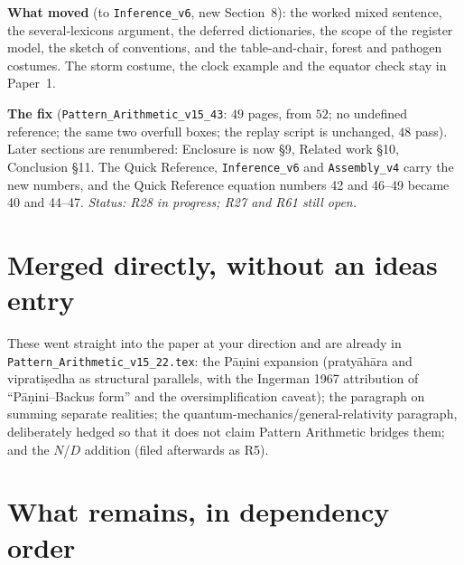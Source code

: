 \documentclass[11pt]{article}
\begin{document}
\textbf{What moved} (to \texttt{Inference\_v6}, new Section~8): the worked mixed sentence, the several-lexicons argument, the deferred dictionaries, the scope of the register model, the sketch of conventions, and the table-and-chair, forest and pathogen costumes. The storm costume, the clock example and the equator check stay in Paper~1.

\textbf{The fix} (\texttt{Pattern\_Arithmetic\_v15\_43}: $49$ pages, from $52$; no undefined reference; the same two overfull boxes; the replay script is unchanged, $48$ pass). Later sections are renumbered: Enclosure is now \S9, Related work \S10, Conclusion \S11. The Quick Reference, \texttt{Inference\_v6} and \texttt{Assembly\_v4} carry the new numbers, and the Quick Reference equation numbers 42 and 46--49 became 40 and 44--47.
\emph{Status: R28 in progress; R27 and R61 still open.}

\section{Merged directly, without an ideas entry}

These went straight into the paper at your direction and are already
in \texttt{Pattern\_\allowbreak Arithmetic\_\allowbreak v15\_\allowbreak 22.tex}: the Pāṇini expansion
(pratyāhāra and vipratiṣedha as structural parallels, with the
Ingerman 1967 attribution of ``Pāṇini--Backus form'' and the
oversimplification caveat); the paragraph on summing separate
realities; the quantum-mechanics/general-relativity paragraph,
deliberately hedged so that it does not claim Pattern Arithmetic
bridges them; and the $N$/$D$ addition (filed afterwards as R5).

\section{What remains, in dependency order}
\end{document}
